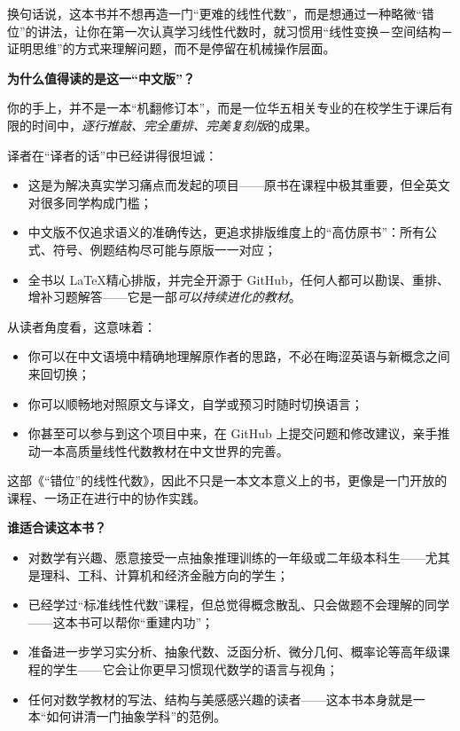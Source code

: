 \begin{preface}[推荐序]
换句话说，这本书并不想再造一门“更难的线性代数”，而是想通过一种略微“错位”的讲法，让你在第一次认真学习线性代数时，就习惯用“线性变换－空间结构－证明思维”的方式来理解问题，而不是停留在机械操作层面。

\textbf{为什么值得读的是这一“中文版”？}

你的手上，并不是一本“机翻修订本”，而是一位华五相关专业的在校学生于课后有限的时间中，\emph{逐行推敲、完全重排、完美复刻版}的成果。

译者在“译者的话”中已经讲得很坦诚：
\begin{itemize}
  \item 这是为解决真实学习痛点而发起的项目——原书在课程中极其重要，但全英文对很多同学构成门槛；
  \item 中文版不仅追求语义的准确传达，更追求排版维度上的“高仿原书”：所有公式、符号、例题结构尽可能与原版一一对应；
  \item 全书以 \LaTeX 精心排版，并完全开源于 GitHub，任何人都可以勘误、重排、增补习题解答——它是一部\emph{可以持续进化的教材}。
\end{itemize}

从读者角度看，这意味着：

\begin{itemize}
  \item 你可以在中文语境中精确地理解原作者的思路，不必在晦涩英语与新概念之间来回切换；
  \item 你可以顺畅地对照原文与译文，自学或预习时随时切换语言；
  \item 你甚至可以参与到这个项目中来，在 GitHub 上提交问题和修改建议，亲手推动一本高质量线性代数教材在中文世界的完善。
\end{itemize}

这部《“错位”的线性代数》，因此不只是一本文本意义上的书，更像是一门开放的课程、一场正在进行中的协作实践。

\textbf{谁适合读这本书？}

\begin{itemize}
  \item 对数学有兴趣、愿意接受一点抽象推理训练的一年级或二年级本科生——尤其是理科、工科、计算机和经济金融方向的学生；
  \item 已经学过“标准线性代数”课程，但总觉得概念散乱、只会做题不会理解的同学——这本书可以帮你“重建内功”；
  \item 准备进一步学习实分析、抽象代数、泛函分析、微分几何、概率论等高年级课程的学生——它会让你更早习惯现代数学的语言与视角；
  \item 任何对数学教材的写法、结构与美感感兴趣的读者——这本书本身就是一本“如何讲清一门抽象学科”的范例。
\end{itemize}


\end{preface}
